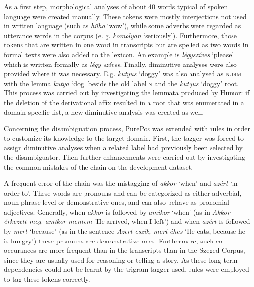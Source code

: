 As a first step, morphological analyses of about 40 words typical of spoken language were created manually. These tokens were mostly interjections not used in written language (such as \textit{hűha} `wow’), while some adverbs were regarded as utterance words
in the corpus (e. g. \textit{komolyan} `seriously’). Furthermore, those tokens that are written in one word in transcripts but are spelled as two words in formal texts were also added to the lexicon. An example is \textit{légyszíves} `please’ which is written formally as \textit{légy szíves}. Finally, diminutive analyses were also provided where it was necessary. E.g. \textit{kutyus} `doggy’ was also analysed as \textsc{n.dim} with the lemma \textit{kutya} `dog’ beside the old label \textsc{n} and the \textit{kutyus} `doggy’ root. This process was carried out by investigating the lemmata produced by Humor: if the deletion of the derivational affix resulted in a root that was enumerated in a domain-specific list, a new diminutive analysis was created as well. 

Concerning the disambiguation process, PurePos was extended with rules in order to customize its knowledge to the target domain. First, the tagger was forced to assign diminutive analyses when a related label had previously been selected by the disambiguator. Then further enhancements were carried out by investigating the common mistakes of the chain on the development dataset.

A frequent error of the chain was the mistagging of \textit{akkor} `when’ and \textit{azért} `in order to’. These words are pronouns and can be categorized as either adverbial, noun phrase level or demonstrative ones, and can also behave as pronomial adjectives. Generally, when \textit{akkor} is followed by \textit{amikor} `when’ (as in \textit{Akkor érkezett meg, amikor mentem} `He arrived, when I left’) and when \textit{azért} is followed by \textit{mert} `because’ (as in the sentence \textit{Azért eszik, mert éhes} `He eats, because he is hungry’) these pronouns are demonstrative ones. Furthermore, such co-occurances are more frequent than in the transcripts than in the Szeged Corpus, since they are usually used for reasoning or telling a story. As these long-term dependencies could not be learnt by the trigram tagger used, rules were employed to tag these tokens correctly.

